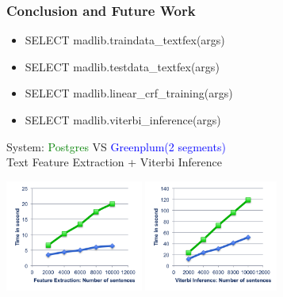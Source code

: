 \documentclass{beamer}
\begin{document}
\begin{frame}
  \frametitle{Conclusion and Future Work}

  \begin{itemize}
    \item SELECT madlib.traindata\_textfex(args)
    \item SELECT madlib.testdata\_textfex(args)
    \item SELECT madlib.linear\_crf\_training(args)
    \item SELECT madlib.viterbi\_inference(args)
  \end{itemize}
  \begin{center}System: \textcolor{green}{Postgres} VS \textcolor{blue}{Greenplum(2 segments)}\\
	  Text Feature Extraction + Viterbi Inference\end{center}
  \begin{center}
	  \includegraphics[height=9.9em]{extraction.png}
	  \includegraphics[height=9.9em]{viterbi.png}
  \end{center}
\end{frame}
\end{document}
